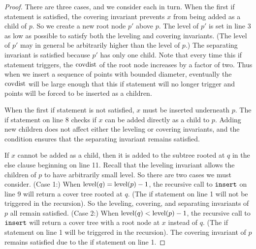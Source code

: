 \documentclass[../main.tex]{subfiles}
\newcommand{\mkfunction}[1]{\ifmmode{\text{{#1}}}}
\newcommand{\level}[1]      {\mkfunction{level}({#1})}
\newcommand{\ctinsert}{\ensuremath{\textnormal{\ttfamily insert}}}
\begin{document}
\begin{proof}
    There are three cases, and we consider each in turn.
    When the first if statement is satisfied, 
    the covering invariant prevents $x$ from being added as a child of $p$.
    So we create a new root node $p'$ above $p$.
    The level of $p'$ is set in line 3 as low as possible to satisfy both the leveling and covering invariants.
    (The level of $p'$ may in general be arbitrarily higher than the level of $p$.)
    The separating invariant is satisfied because $p'$ has only one child.
    Note that every time this if statement triggers,
    the $\mkfunction{covdist}$ of the root node increases by a factor of two.
    Thus when we insert a sequence of points with bounded diameter, 
    eventually the $\mkfunction{covdist}$ will be large enough that this if statement will no longer trigger and points will be forced to be inserted as a children.

    When the first if statement is not satisfied, 
    $x$ must be inserted underneath $p$.
    The if statement on line 8 checks if $x$ can be added directly as a child to $p$.
    Adding new children does not affect either the leveling or covering invariants,
    and the condition ensures that the separating invariant remains satisfied.

    If $x$ cannot be added as a child, 
    then it is added to the subtree rooted at $q$ in the else clause beginning on line 11.
    Recall that the leveling invariant allows the children of $p$ to have arbitrarily small level.
    So there are two cases we must consider.
    (Case 1:) When $\level{q}=\level{p}-1$, 
    the recursive call to $\ctinsert$ on line 9 will return a cover tree rooted at $q$.
    (The if statement on line 1 will not be triggered in the recursion).
    So the leveling, covering, and separating invariants of $p$ all remain satisfied.
    (Case 2:) When $\level{q}<\level{p}-1$, 
    the recursive call to $\ctinsert$ will return a cover tree with a root node at $x$ instead of $q$.
    (The if statement on line 1 will be triggered in the recursion).
    The covering invariant of $p$ remains satisfied due to the if statement on line 1.
\end{proof}
\end{document}
